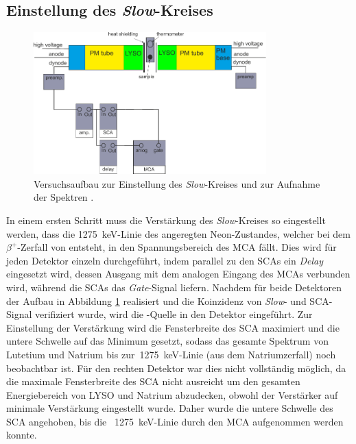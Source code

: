 \documentclass[11pt, a4paper]{article}
\numberwithin{equation}{section}
\begin{document}
\subsection{Einstellung des \textit{Slow}-Kreises}
\begin{figure}[h]
	\centering
	\includegraphics[width=0.8\textwidth]{./figures/aufbau/energie.pdf}
	\caption{Versuchsaufbau zur Einstellung des \textit{Slow}-Kreises und zur Aufnahme der Spektren \cite{anleitung}.}
	\label{fig:slow_kreis}
\end{figure}
In einem ersten Schritt muss die Verstärkung des \textit{Slow}-Kreises so eingestellt werden, dass die \SI{1275}{\keV}-Linie des angeregten Neon-Zustandes, welcher bei dem $\beta^+$-Zerfall von  entsteht, in den Spannungsbereich des MCA fällt.
Dies wird für jeden Detektor einzeln durchgeführt, indem parallel zu den SCAs ein \textit{Delay} eingesetzt wird, dessen Ausgang mit dem analogen Eingang des MCAs verbunden wird, während die SCAs das \textit{Gate}-Signal liefern.
Nachdem für beide Detektoren der Aufbau in Abbildung \ref{fig:slow_kreis} realisiert und die Koinzidenz von \textit{Slow}- und SCA-Signal verifiziert wurde, wird die -Quelle in den Detektor eingeführt.
Zur Einstellung der Verstärkung wird die Fensterbreite des SCA maximiert und die untere Schwelle auf das Minimum gesetzt, sodass das gesamte Spektrum von Lutetium und Natrium bis zur~\SI{1275}{keV}-Linie (aus dem Natriumzerfall) noch beobachtbar ist.
Für den rechten Detektor war dies nicht vollständig möglich, da die maximale Fensterbreite des SCA nicht ausreicht um den gesamten Energiebereich von LYSO und Natrium abzudecken, obwohl der Verstärker auf minimale Verstärkung eingestellt wurde.
Daher wurde die untere Schwelle des SCA angehoben, bis die ~\SI{1275}{keV}-Linie durch den MCA aufgenommen werden konnte.
\end{document}

